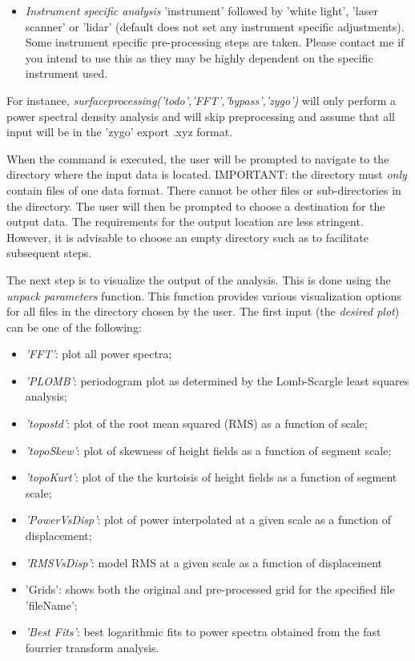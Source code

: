 \documentclass[12pt,a4paper]{article}
\begin{document}
\begin{itemize}
\begin{itemize}
\item \textit{Instrument specific analysis} 'instrument' followed by 'white light', 'laser scanner' or 'lidar' (default does not set any instrument specific adjustments). Some instrument specific pre-processing steps are taken. Please contact me if you intend to use this as they may be highly dependent on the specific instrument used.
	 
\end{itemize}

For instance, \textit{surfaceprocessing('todo','FFT','bypass','zygo')} will only perform a power spectral density analysis and will skip preprocessing and assume that all input will be in the 'zygo' export .xyz format.

When the command is executed, the user will be prompted to navigate to the directory where the input data is located. IMPORTANT: the directory must \textit{only} contain files of one data format. There cannot be other files or sub-directories in the directory. The user will then be prompted to choose a destination for the output data. The requirements for the output location are less stringent. However, it is advisable to choose an empty directory such as to facilitate subsequent steps.

The next step is to visualize the output of the analysis. This is done using the \textit{unpack parameters} function. This function provides various visualization options for all files in the directory chosen by the user. The first input (the \textit{desired plot}) can be one of the following:

\begin{itemize}
\item[] \textit{'FFT'}: plot all power spectra;
\item[] \textit{'PLOMB'}: periodogram plot as determined by the Lomb-Scargle least squares analysis;
\item[] \textit{'topostd'}: plot of the root mean squared (RMS) as a function of scale;
\item[] \textit{'topoSkew'}: plot of skewness of height fields as a function of segment scale;
\item[] \textit{'topoKurt'}: plot of the the kurtoisis of height fields as a function of segment scale;
\item[] \textit{'PowerVsDisp'}: plot of power interpolated at a given scale as a function of displacement;
\item[] \textit{'RMSVsDisp'}: model RMS at a given scale as a function of displacement
\item[] 'Grids': shows both the original and pre-processed grid for the specified file 'fileName';
\item[] \textit{'Best Fits'}: best logarithmic fits to power spectra obtained from the fast fourrier transform analysis.
\end{itemize}


\end{itemize}
\end{document}
